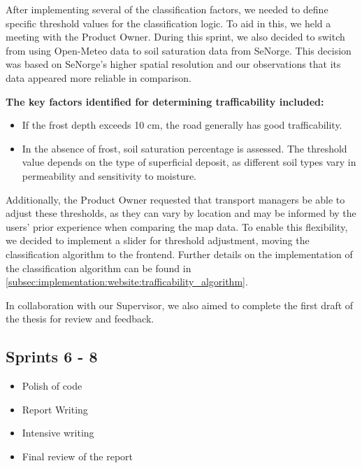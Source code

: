 After implementing several of the classification factors, we needed to define specific threshold values for the classification logic. To aid in this, we held a meeting with the Product Owner. During this sprint, we also decided to switch from using Open-Meteo data to soil saturation data from SeNorge. This decision was based on SeNorge’s higher spatial resolution and our observations that its data appeared more reliable in comparison.

\textbf{The key factors identified for determining trafficability included:}

\begin{itemize}
    \item If the frost depth exceeds 10 cm, the road generally has good trafficability.
    \item In the absence of frost, soil saturation percentage is assessed. The threshold value depends on the type of superficial deposit, as different soil types vary in permeability and sensitivity to moisture.
\end{itemize}

Additionally, the Product Owner requested that transport managers be able to adjust these thresholds, as they can vary by location and may be informed by the users’ prior experience when comparing the map data. To enable this flexibility, we decided to implement a slider for threshold adjustment, moving the classification algorithm to the frontend. Further details on the implementation of the classification algorithm can be found in \autoref{subsec:implementation:website:trafficability_algorithm}.

In collaboration with our Supervisor, we also aimed to complete the first draft of the thesis for review and feedback.

\subsection{Sprints 6 - 8}
\begin{itemize}
    \item Polish of code
    \item Report Writing
\end{itemize}

\begin{itemize}
    \item Intensive writing
\end{itemize}

\begin{itemize}
    \item Final review of the report
\end{itemize}

